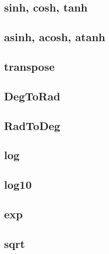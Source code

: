 \subsection{sinh, cosh, tanh}

\subsection{asinh, acosh, atanh}

\subsection{transpose}

\subsection{DegToRad}

\subsection{RadToDeg}

\subsection{log}

\subsection{log10}

\subsection{exp}

\subsection{sqrt}

